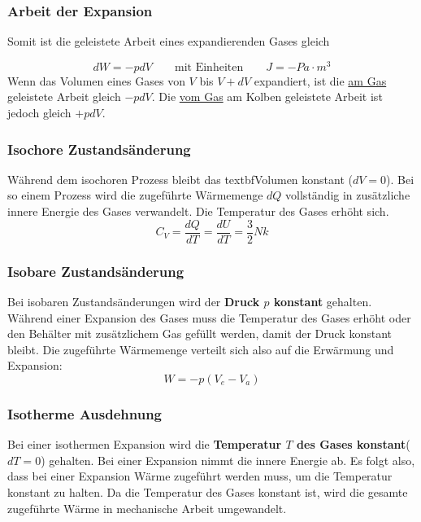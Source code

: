 \documentclass[11pt]{article}
\begin{document}
\subsubsection{Arbeit der Expansion}
Somit ist die geleistete Arbeit eines expandierenden Gases gleich

\begin{equation*}
	dW = -pdV \qquad\text{mit Einheiten}\qquad J = -Pa\cdot m^3
\end{equation*}
Wenn das Volumen eines Gases von $V$ bis $V + dV$ expandiert, ist die \underline{am Gas} geleistete Arbeit gleich $-pdV$. Die \underline{vom Gas} am Kolben geleistete Arbeit ist jedoch gleich $+pdV$.

\subsubsection{Isochore Zustands{\"a}nderung}

W{\"a}hrend dem isochoren Prozess bleibt das textbf{Volumen konstant} ($dV = 0$). Bei so einem Prozess wird die zugef{\"u}hrte W{\"a}rmemenge $dQ$ vollst{\"a}ndig in zus{\"a}tzliche innere Energie des Gases verwandelt. Die Temperatur des Gases erh{\"o}ht sich.
\begin{equation*}
	C_V = \frac{dQ}{dT} = \frac{dU}{dT} = \frac{3}{2	}Nk
\end{equation*}

\subsubsection{Isobare Zustands{\"a}nderung}

Bei isobaren Zustands{\"a}nderungen wird der \textbf{Druck $p$ konstant} gehalten. W{\"a}hrend einer Expansion des Gases muss die Temperatur des Gases erh{\"o}ht oder den Beh{\"a}lter mit zus{\"a}tzlichem Gas gef{\"u}llt werden, damit der Druck konstant bleibt. \newline
Die zugef{\"u}hrte W{\"a}rmemenge verteilt sich also auf die Erw{\"a}rmung und Expansion:
\begin{equation*}
	W = -p(V_e - V_a)
\end{equation*}

\subsubsection{Isotherme Ausdehnung}

Bei einer isothermen Expansion wird die \textbf{Temperatur $T$ des Gases konstant}($dT = 0$) gehalten. Bei einer Expansion nimmt die innere Energie ab. Es folgt also, dass bei einer Expansion W{\"a}rme zugef{\"u}hrt werden muss, um die Temperatur konstant zu halten. \newline
Da die Temperatur des Gases konstant ist, wird die gesamte zugef{\"u}hrte W{\"a}rme in mechanische Arbeit umgewandelt. \newline
\end{document}
